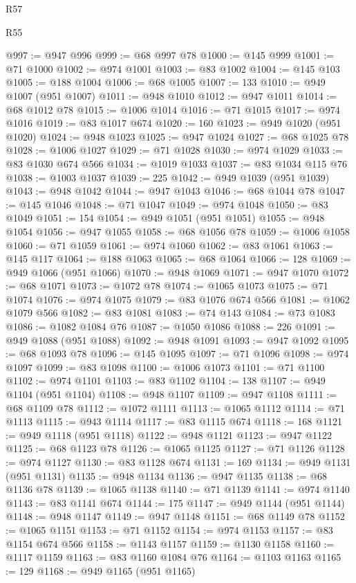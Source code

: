 \begin{lexlean}{R57}
\begin{lexlean}{R55}
\begin{coremodule}
{{{{{{{{{{{{{{{{{{{{{{{{{{{{{{{{{{{{{{{{{{{{{{{{{{{{{{{{{{{{{{@997 := @947 @996
@999 := @68 @997 @78
@1000 := @145 @999
@1001 := @71 @1000
@1002 := @974 @1001
@1003 := @83 @1002
@1004 := @145 @103
@1005 := @188 @1004
@1006 := @68 @1005
@1007 := 133
@1010 := @949 @1007 (@951 @1007)
@1011 := @948 @1010
@1012 := @947 @1011
@1014 := @68 @1012 @78
@1015 := @1006 @1014
@1016 := @71 @1015
@1017 := @974 @1016
@1019 := @83 @1017 @674
@1020 := 160
@1023 := @949 @1020 (@951 @1020)
@1024 := @948 @1023
@1025 := @947 @1024
@1027 := @68 @1025 @78
@1028 := @1006 @1027
@1029 := @71 @1028
@1030 := @974 @1029
@1033 := @83 @1030 @674 @566
@1034 := @1019 @1033
@1037 := @83 @1034 @115 @76
@1038 := @1003 @1037
@1039 := 225
@1042 := @949 @1039 (@951 @1039)
@1043 := @948 @1042
@1044 := @947 @1043
@1046 := @68 @1044 @78
@1047 := @145 @1046
@1048 := @71 @1047
@1049 := @974 @1048
@1050 := @83 @1049
@1051 := 154
@1054 := @949 @1051 (@951 @1051)
@1055 := @948 @1054
@1056 := @947 @1055
@1058 := @68 @1056 @78
@1059 := @1006 @1058
@1060 := @71 @1059
@1061 := @974 @1060
@1062 := @83 @1061
@1063 := @145 @117
@1064 := @188 @1063
@1065 := @68 @1064
@1066 := 128
@1069 := @949 @1066 (@951 @1066)
@1070 := @948 @1069
@1071 := @947 @1070
@1072 := @68 @1071
@1073 := @1072 @78
@1074 := @1065 @1073
@1075 := @71 @1074
@1076 := @974 @1075
@1079 := @83 @1076 @674 @566
@1081 := @1062 @1079 @566
@1082 := @83 @1081
@1083 := @74 @143
@1084 := @73 @1083
@1086 := @1082 @1084 @76
@1087 := @1050 @1086
@1088 := 226
@1091 := @949 @1088 (@951 @1088)
@1092 := @948 @1091
@1093 := @947 @1092
@1095 := @68 @1093 @78
@1096 := @145 @1095
@1097 := @71 @1096
@1098 := @974 @1097
@1099 := @83 @1098
@1100 := @1006 @1073
@1101 := @71 @1100
@1102 := @974 @1101
@1103 := @83 @1102
@1104 := 138
@1107 := @949 @1104 (@951 @1104)
@1108 := @948 @1107
@1109 := @947 @1108
@1111 := @68 @1109 @78
@1112 := @1072 @1111
@1113 := @1065 @1112
@1114 := @71 @1113
@1115 := @943 @1114
@1117 := @83 @1115 @674
@1118 := 168
@1121 := @949 @1118 (@951 @1118)
@1122 := @948 @1121
@1123 := @947 @1122
@1125 := @68 @1123 @78
@1126 := @1065 @1125
@1127 := @71 @1126
@1128 := @974 @1127
@1130 := @83 @1128 @674
@1131 := 169
@1134 := @949 @1131 (@951 @1131)
@1135 := @948 @1134
@1136 := @947 @1135
@1138 := @68 @1136 @78
@1139 := @1065 @1138
@1140 := @71 @1139
@1141 := @974 @1140
@1143 := @83 @1141 @674
@1144 := 175
@1147 := @949 @1144 (@951 @1144)
@1148 := @948 @1147
@1149 := @947 @1148
@1151 := @68 @1149 @78
@1152 := @1065 @1151
@1153 := @71 @1152
@1154 := @974 @1153
@1157 := @83 @1154 @674 @566
@1158 := @1143 @1157
@1159 := @1130 @1158
@1160 := @1117 @1159
@1163 := @83 @1160 @1084 @76
@1164 := @1103 @1163
@1165 := 129
@1168 := @949 @1165 (@951 @1165)
}}}}}}}}}}}}}}}}}}}}}}}}}}}}}}}}}}}}}}}}}}}}}}}}}}}}}}}}}}}}}}
\end{coremodule}
\end{lexlean}
\end{lexlean}
